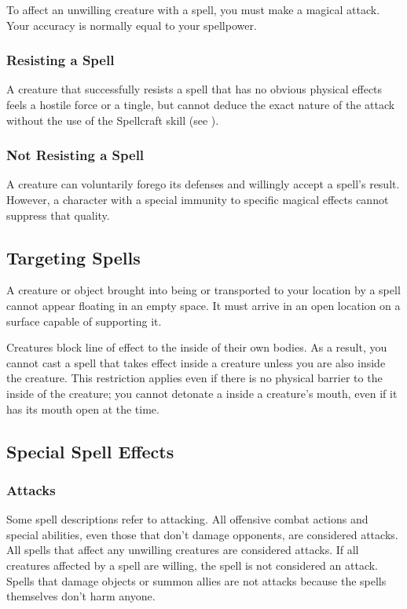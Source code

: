 To affect an unwilling creature with a spell, you must make a magical attack. Your accuracy is normally equal to your spellpower.

\subsubsection{Resisting a Spell} A creature that successfully resists a spell that has no obvious physical effects feels a hostile force or a tingle, but cannot deduce the exact nature of the attack without the use of the Spellcraft skill (see ).

\subsubsection{Not Resisting a Spell} A creature can voluntarily forego its defenses and willingly accept a spell's result. However, a character with a special immunity to specific magical effects cannot suppress that quality.

\subsection{Targeting Spells}

 A creature or object brought into being or transported to your location by a spell cannot appear floating in an empty space. It must arrive in an open location on a surface capable of supporting it.

 Creatures block line of effect to the inside of their own bodies. As a result, you cannot cast a spell that takes effect inside a creature unless you are also inside the creature. This restriction applies even if there is no physical barrier to the inside of the creature; you cannot detonate a  inside a creature's mouth, even if it has its mouth open at the time.

\subsection{Special Spell Effects}

\subsubsection{Attacks}
Some spell descriptions refer to attacking. All offensive combat actions and special abilities, even those that don't damage opponents, are considered attacks. All spells that affect any unwilling creatures are considered attacks. If all creatures affected by a spell are willing, the spell is not considered an attack. Spells that damage objects or summon allies are not attacks because the spells themselves don't harm anyone.


